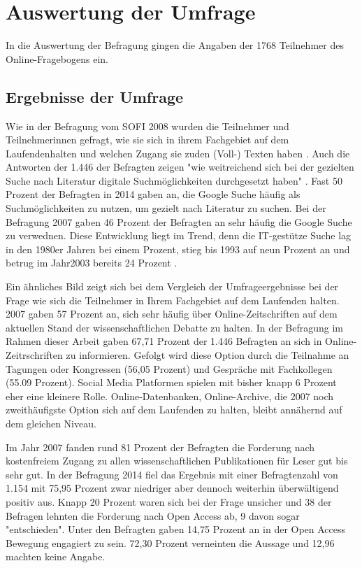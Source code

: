 \section{Auswertung der Umfrage}

In die Auswertung der Befragung gingen die Angaben der 1768 Teilnehmer des Online-Fragebogens ein.


\subsection{Ergebnisse der Umfrage}

Wie in der Befragung vom SOFI 2008 wurden die Teilnehmer und Teilnehmerinnen gefragt, wie sie sich in ihrem Fachgebiet auf dem Laufendenhalten und welchen Zugang sie zuden (Voll-) Texten haben \cite{hanekop_2008}. Auch die Antworten der 1.446 der Befragten zeigen "wie weitreichend sich bei der gezielten Suche nach Literatur digitale Suchmöglichkeiten durchgesetzt haben" \cite{hanekop_2008}. Fast 50 Prozent der Befragten in 2014 gaben an, die Google Suche häufig als Suchmöglichkeiten zu nutzen, um gezielt nach Literatur zu suchen. Bei der Befragung 2007 gaben 46 Prozent der Befragten an sehr häufig die Google Suche zu verwednen. Diese Entwicklung liegt im Trend, denn die IT-gestütze Suche lag in den 1980er Jahren bei einem Prozent, stieg bis 1993 auf neun Prozent an und betrug im Jahr2003 bereits 24 Prozent \cite{hanekop_2008}.


Ein ähnliches Bild zeigt sich bei dem Vergleich der Umfrageergebnisse bei der Frage wie sich die Teilnehmer in Ihrem Fachgebiet auf dem Laufenden halten. 2007 gaben 57 Prozent an, sich sehr häufig über Online-Zeitschriften auf dem aktuellen Stand der wissenschaftlichen Debatte zu halten. In der Befragung im Rahmen dieser Arbeit gaben 67,71 Prozent der 1.446 Befragten an sich in Online-Zeitrschriften zu informieren. Gefolgt wird diese Option durch die Teilnahme an Tagungen oder Kongressen (56,05 Prozent) und Gespräche mit Fachkollegen (55.09 Prozent). Social Media Platformen spielen mit bisher knapp 6 Prozent eher eine kleinere Rolle. Online-Datenbanken, Online-Archive, die 2007 noch zweithäufigste Option sich auf dem Laufenden zu halten, bleibt annähernd auf dem gleichen Niveau.

Im Jahr 2007 fanden rund 81 Prozent der Befragten die Forderung nach kostenfreiem Zugang zu allen wissenschaftlichen Publikationen für Leser gut bis sehr gut. In der Befragung 2014 fiel das Ergebnis mit einer Befragtenzahl von 1.154 mit 75,95 Prozent zwar niedriger aber dennoch weiterhin überwältigend positiv aus. Knapp 20 Prozent waren sich bei der Frage unsicher und 38 der Befragen lehnten die Forderung nach Open Access ab, 9 davon sogar "entschieden". Unter den Befragten gaben 14,75 Prozent an in der Open Access Bewegung engagiert zu sein. 72,30 Prozent verneinten die Aussage und 12,96 machten keine Angabe.